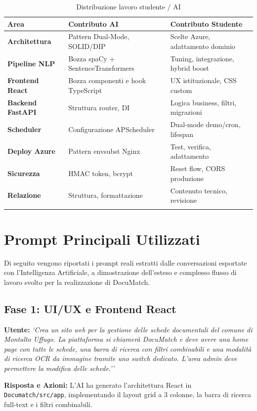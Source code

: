 \documentclass[12pt,a4paper,oneside]{report}
\begin{document}
\begin{longtable}{>{\bfseries}p{3.2cm} p{4.5cm} p{4.5cm}}
    \toprule
    \textbf{Area} & \textbf{Contributo AI} & \textbf{Contributo Studente} \\
    \midrule
    \endhead
    Architettura & Pattern Dual-Mode, SOLID/DIP & Scelte Azure, adattamento dominio \\
    Pipeline NLP & Bozza spaCy + SentenceTransformers & Tuning, integrazione, hybrid boost \\
    Frontend React & Bozza componenti e hook TypeScript & UX istituzionale, CSS custom \\
    Backend FastAPI & Struttura router, DI & Logica business, filtri, migrazioni \\
    Scheduler & Configurazione APScheduler & Dual-mode demo/cron, lifespan \\
    Deploy Azure & Pattern envsubst Nginx & Test, verifica, adattamento \\
    Sicurezza & HMAC token, bcrypt & Reset flow, CORS produzione \\
    Relazione & Struttura, formattazione & Contenuto tecnico, revisione \\
    \bottomrule
    \caption{Distribuzione lavoro studente / AI}
\end{longtable}

\section{Prompt Principali Utilizzati}

Di seguito vengono riportati i prompt reali estratti dalle conversazioni esportate con l'Intelligenza Artificiale, a dimostrazione dell'esteso e complesso flusso di lavoro svolto per la realizzazione di DocuMatch.

\subsection{Fase 1: UI/UX e Frontend React}

\begin{promptbox}[title={Prompt 1 --- Progettazione Interfaccia Base}]
\textbf{Utente:} \textit{`Crea un sito web per la gestione delle schede documentali del comune di Montalto Uffugo. La piattaforma si chiamerà DocuMatch e deve avere una home page con tutte le schede, una barra di ricerca con filtri combinabili e una modalità di ricerca OCR da immagine tramite uno switch dedicato. L'area admin deve permettere la modifica delle schede.''}

\textbf{Risposta e Azioni:} L'AI ha generato l'architettura React in \texttt{Documatch/src/app}, implementando il layout grid a 3 colonne, la barra di ricerca full-text e i filtri combinabili.
\end{promptbox}
\end{document}
